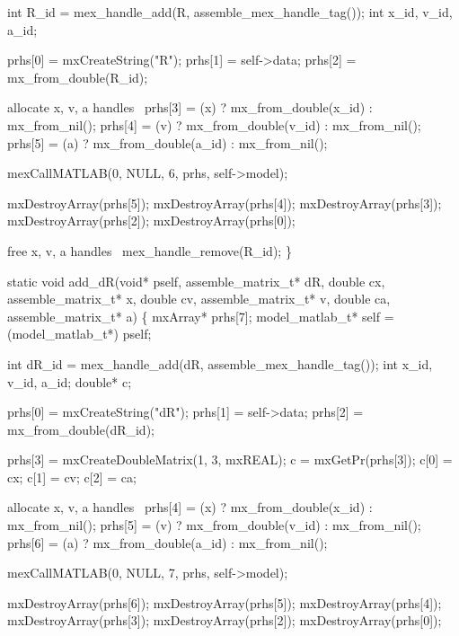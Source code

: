     int R_id = mex_handle_add(R, assemble_mex_handle_tag());
    int x_id, v_id, a_id;

    prhs[0] = mxCreateString("R");
    prhs[1] = self->data;
    prhs[2] = mx_from_double(R_id);

    \LA{}allocate x, v, a handles~{\nwtagstyle{}}\RA{}
    prhs[3] = (x) ? mx_from_double(x_id) : mx_from_nil();
    prhs[4] = (v) ? mx_from_double(v_id) : mx_from_nil();
    prhs[5] = (a) ? mx_from_double(a_id) : mx_from_nil();

    mexCallMATLAB(0, NULL, 6, prhs, self->model); 

    mxDestroyArray(prhs[5]);
    mxDestroyArray(prhs[4]);
    mxDestroyArray(prhs[3]);
    mxDestroyArray(prhs[2]);
    mxDestroyArray(prhs[0]);

    \LA{}free x, v, a handles~{\nwtagstyle{}}\RA{}
    mex_handle_remove(R_id);
\}

\nwendcode{}\nwdocspar

\nwenddocs{}\plusendmoddef
static void add_dR(void* pself, assemble_matrix_t* dR,
                   double cx, assemble_matrix_t* x,
                   double cv, assemble_matrix_t* v,
                   double ca, assemble_matrix_t* a)
\{
    mxArray* prhs[7];
    model_matlab_t* self = (model_matlab_t*) pself;

    int dR_id = mex_handle_add(dR, assemble_mex_handle_tag());
    int x_id, v_id, a_id;
    double* c;

    prhs[0] = mxCreateString("dR");
    prhs[1] = self->data;
    prhs[2] = mx_from_double(dR_id);

    prhs[3] = mxCreateDoubleMatrix(1, 3, mxREAL);
    c = mxGetPr(prhs[3]);
    c[0] = cx;
    c[1] = cv;
    c[2] = ca;

    \LA{}allocate x, v, a handles~{\nwtagstyle{}}\RA{}
    prhs[4] = (x) ? mx_from_double(x_id) : mx_from_nil();
    prhs[5] = (v) ? mx_from_double(v_id) : mx_from_nil();
    prhs[6] = (a) ? mx_from_double(a_id) : mx_from_nil();

    mexCallMATLAB(0, NULL, 7, prhs, self->model); 

    mxDestroyArray(prhs[6]);
    mxDestroyArray(prhs[5]);
    mxDestroyArray(prhs[4]);
    mxDestroyArray(prhs[3]);
    mxDestroyArray(prhs[2]);
    mxDestroyArray(prhs[0]);

